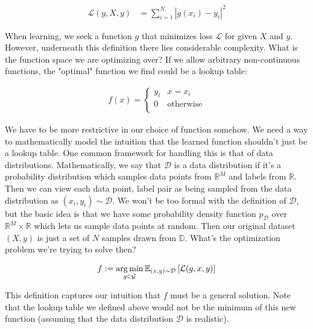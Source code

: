 \documentclass[book.tex]{subfiles}
\begin{document}
\begin{align}
\mathcal{L}(g, X, y) &= \sum_{i=1}^N |g(x_i) - y_i|^2 
\end{align}


When learning, we seek a function $g$ that minimizes loss $\mathcal{L}$ for given $X$ and $y$. However, underneath this definition there lies considerable complexity. What is the function space we are optimizing over? If we allow arbitrary non-continuous functions, the "optimal" function we find could be a lookup table:

\begin{align}
f(x) = \begin{cases}
y_i & x = x_i \\
0 & \textrm{otherwise} \\
\end{cases}
\end{align}

We have to be more restrictive in our choice of function somehow. We need a way to mathematically model the intuition that the learned function shouldn't just be a lookup table. One common framework for handling this is that of data distributions. Mathematically, we say that $\mathcal{D}$ is a data distribution if it's a probability distribution which samples data points from $\mathbb{R}^M$ and labels from $\mathbb{R}$. Then we can view each data point, label pair as being sampled from the data distribution as $(x_i, y_i) \sim \mathcal{D}$. We won't be too formal with the definition of $\mathcal{D}$, but the basic idea is that we have some probability density function $p_{\mathcal{D}}$ over $\mathbb{R}^M \times \mathbb{R}$ which lets us sample data points at random. Then our original dataset $(X, y)$ is just a set of $N$ samples drawn from $\mathbb{D}$. What's the optimization problem we're trying to solve then? 

\begin{align} 
f := \operatorname*{arg\,min}_{g \in \mathcal{G}} \mathbb{E}_{(x, y) \sim \mathcal{D}} \left [\mathcal{L}(g, x, y) \right] 
\end{align}

This definition captures our intuition that $f$ must be a general solution. Note that the lookup table we defined above would not be the minimum of this new function (assuming that the data distribution $\mathcal{D}$ is realistic). 
\end{document}
